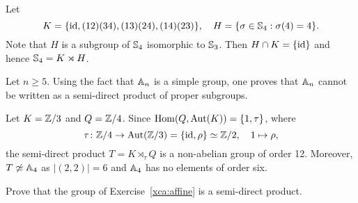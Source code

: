 \begin{example}
Let 
\[
K=\{\operatorname{id},(12)(34),(13)(24),(14)(23)\},\quad  
H=\{\sigma\in\mathbb{S}_4:\sigma(4)=4\}.
\]
Note that $H$ is a subgroup of 
$\mathbb{S}_4$ isomorphic to $\mathbb{S}_3$. Then $H\cap K=\{\operatorname{id}\}$ and hence 
$\mathbb{S}_4=K\rtimes H$.
\end{example}

Let $n\geq5$. 
Using the fact that $\mathbb{A}_n$ is a simple group,  
one proves that $\mathbb{A}_n$ cannot be written as a semi-direct product of proper subgroups. 

\begin{example}
Let $K=\mathbb{Z}/3$ and $Q=\mathbb{Z}/4$. Since $\operatorname{Hom}(Q,\operatorname{Aut}(K))=\{1,\tau\}$, where 
\[
\tau\colon\mathbb{Z}/4\to\operatorname{Aut}(\mathbb{Z}/3)=\{\operatorname{id},\rho\}\simeq\mathbb{Z}/2,\quad 1\mapsto\rho,
\]
the semi-direct product $T=K\rtimes_\tau Q$ is a non-abelian group of order 12. Moreover,
$T\not\simeq\mathbb{A}
_4$ as $|(2,2)|=6$ and $\mathbb{A}_4$ has no elements of order six.
\end{example}


\begin{exercise}
    \label{xca:affine_semidirect}
    Prove that the group of Exercise~\ref{xca:affine} is a semi-direct product. 
\end{exercise}
